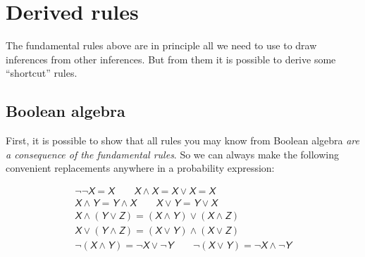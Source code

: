 \documentclass[
  a4paper,
  DIV=11,
  numbers=noendperiod,
  oneside]{scrreprt}
\begin{document}
\hypertarget{derived-rules}{%
\section{Derived rules}\label{derived-rules}}

The fundamental rules above are in principle all we need to use to draw
inferences from other inferences. But from them it is possible to derive
some ``shortcut'' rules.

\hypertarget{sec-boolean}{%
\subsection{Boolean algebra}\label{sec-boolean}}

First, it is possible to show that all rules you may know from Boolean
algebra \emph{are a consequence of the fundamental rules}. So we can
always make the following convenient replacements anywhere in a
probability expression:

\begin{tcolorbox}[enhanced jigsaw, colback=white, toptitle=1mm, title={Boolean algebra}, arc=.35mm, toprule=.15mm, rightrule=.15mm, coltitle=black, opacityback=0, colframe=quarto-callout-note-color-frame, bottomtitle=1mm, colbacktitle=quarto-callout-note-color!10!white, left=2mm, leftrule=.75mm, titlerule=0mm, breakable, opacitybacktitle=0.6, bottomrule=.15mm]

\[
\begin{gathered}
\lnot\lnot \mathsfit{X}= \mathsfit{X}
\qquad
\mathsfit{X}\land \mathsfit{X}= \mathsfit{X}\lor \mathsfit{X}= \mathsfit{X}
\\[1ex]
\mathsfit{X}\land \mathsfit{Y}= \mathsfit{Y}\land \mathsfit{X}
\qquad
\mathsfit{X}\lor \mathsfit{Y}= \mathsfit{Y}\lor \mathsfit{X}
\\[1ex]
\mathsfit{X}\land (\mathsfit{Y}\lor \mathsfit{Z}) = (\mathsfit{X}\land \mathsfit{Y}) \lor (\mathsfit{X}\land \mathsfit{Z})
\\[1ex]
\mathsfit{X}\lor (\mathsfit{Y}\land \mathsfit{Z}) = (\mathsfit{X}\lor \mathsfit{Y}) \land (\mathsfit{X}\lor \mathsfit{Z})
\\[1ex]
\lnot (\mathsfit{X}\land \mathsfit{Y}) = \lnot \mathsfit{X}\lor \lnot \mathsfit{Y}
\qquad
\lnot (\mathsfit{X}\lor \mathsfit{Y}) = \lnot \mathsfit{X}\land \lnot \mathsfit{Y}
\end{gathered}
\]

\end{tcolorbox}

\hfill\break
\end{document}

